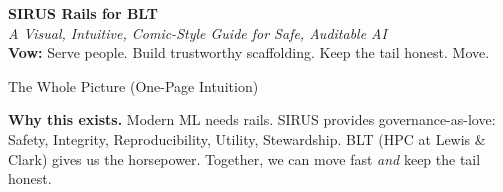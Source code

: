 \documentclass[11pt]{article}
\begin{document}
\begin{center}
{\huge \textbf{SIRUS Rails for BLT}}\\[4pt]
{\large \textit{A Visual, Intuitive, Comic-Style Guide for Safe, Auditable AI}}\\[6pt]
\textcolor{slate}{\small \textbf{Vow:} Serve people. Build trustworthy scaffolding. Keep the tail honest. Move.}\\[10pt]
\end{center}

\begin{panelA}{The Whole Picture (One-Page Intuition)}
\begin{minipage}{0.60\textwidth}
\textbf{Why this exists.} Modern ML needs rails. SIRUS provides governance-as-love: Safety, Integrity, Reproducibility, Utility, Stewardship. BLT (HPC at Lewis \& Clark) gives us the horsepower. Together, we can move fast \emph{and} keep the tail honest.


\end{minipage}
\end{panelA}
\end{document}
